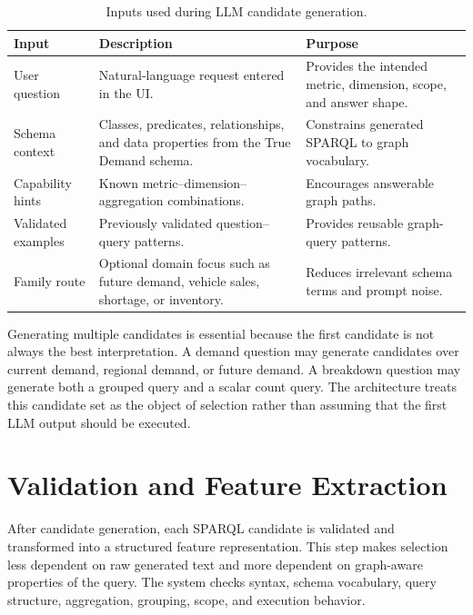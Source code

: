 \documentclass[
  12pt,
  english,
  oneside]{report}
\begin{document}
\begin{table}[htbp]
\centering
\caption{Inputs used during LLM candidate generation.}
\label{tab:candidate-generation-inputs}
\small
\begin{tabularx}{\textwidth}{
>{\raggedright\arraybackslash}p{3.0cm}
>{\raggedright\arraybackslash}p{5.3cm}
>{\raggedright\arraybackslash}X
}
\toprule
\textbf{Input} & \textbf{Description} & \textbf{Purpose} \\
\midrule
User question & Natural-language request entered in the UI. & Provides the intended metric, dimension, scope, and answer shape. \\
Schema context & Classes, predicates, relationships, and data properties from the True Demand schema. & Constrains generated SPARQL to graph vocabulary. \\
Capability hints & Known metric--dimension--aggregation combinations. & Encourages answerable graph paths. \\
Validated examples & Previously validated question--query patterns. & Provides reusable graph-query patterns. \\
Family route & Optional domain focus such as future demand, vehicle sales, shortage, or inventory. & Reduces irrelevant schema terms and prompt noise. \\
\bottomrule
\end{tabularx}
\end{table}

Generating multiple candidates is essential because the first candidate is not always the best interpretation. A demand question may generate candidates over current demand, regional demand, or future demand. A breakdown question may generate both a grouped query and a scalar count query. The architecture treats this candidate set as the object of selection rather than assuming that the first LLM output should be executed.

\section{Validation and Feature Extraction}
\label{sec:validation-feature-extraction}

After candidate generation, each SPARQL candidate is validated and transformed into a structured feature representation. This step makes selection less dependent on raw generated text and more dependent on graph-aware properties of the query. The system checks syntax, schema vocabulary, query structure, aggregation, grouping, scope, and execution behavior.
\end{document}
